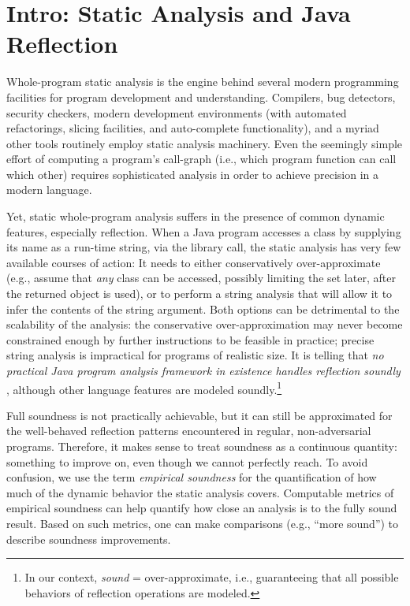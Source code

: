 \section{Intro: Static Analysis and Java Reflection}

Whole-program static analysis is the engine behind several modern
programming facilities for program development and
understanding. Compilers, bug detectors, security checkers, modern
development environments (with automated refactorings, slicing
facilities, and auto-complete functionality), and a myriad other tools
routinely employ static analysis machinery. Even the seemingly simple
effort of computing a program's call-graph (i.e., which program
function can call which other) requires sophisticated analysis in
order to achieve precision in a modern language.

Yet, static whole-program analysis suffers in the presence of common
dynamic features, especially reflection. When a Java program accesses
a class by supplying its name as a run-time string, via the
 library call, the static analysis has
very few available courses of action: It needs to either
conservatively over-approximate (e.g., assume that \emph{any} class
can be accessed, possibly limiting the set later, after the returned
object is used), or to perform a string analysis that will allow it to
infer the contents of the  string argument. Both options
can be detrimental to the scalability of the analysis: the
conservative over-approximation may never become constrained enough by
further instructions to be feasible in practice; precise string
analysis is impractical for programs of realistic size.  It is telling
that \emph{no practical Java program analysis framework in existence
  handles reflection soundly} \cite{soundiness15}, although other
language features are modeled soundly.\footnote{In our context,
  \emph{sound} = over-approximate, i.e., guaranteeing that all
  possible behaviors of reflection operations are modeled.}

%
Full soundness is not practically achievable, but it can still be
approximated for the well-behaved reflection patterns encountered in
regular, non-adversarial programs.  Therefore, it makes sense to treat
soundness as a continuous quantity: something to improve on, even
though we cannot perfectly reach.  To avoid confusion, we use the term
\emph{empirical soundness} for the quantification of how much of the
dynamic behavior the static analysis covers. Computable metrics of
empirical soundness can help quantify how close an analysis is to the
fully sound result. Based on such metrics, one can make comparisons
(e.g., ``more sound'') to describe soundness improvements.

